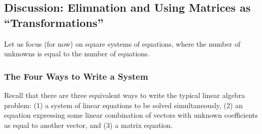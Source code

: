 \documentclass[10pt,]{book}
\theoremstyle{plain}
\numberwithin{equation}{section}
\begin{document}
\subsection[Discussion: Elimnation and Using Matrices as ``Transformations'']{Discussion: Elimnation and Using Matrices as ``Transformations''}\label{subsection-31}

      Let us focus (for now) on square systems of equations, where the number of
      unknowns is equal to the number of equations.
\typeout{************************************************}
\typeout{************************************************}
\subsubsection[The Four Ways to Write a System]{The Four Ways to Write a System}\label{subsubsection-13}

        Recall that there are three equivalent ways to write the typical linear
        algebra problem: (1) a system of linear equations to be solved
        simultaneously, (2) an equation expressing some linear combination of
        vectors with unknown coefficients as equal to another vector, and (3) a
        matrix equation.
\par
\end{document}
